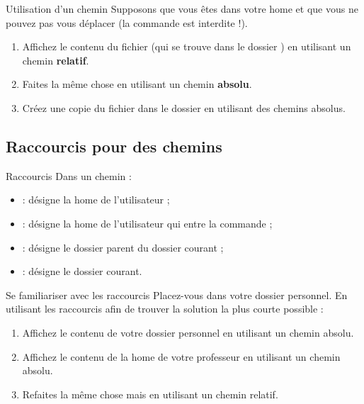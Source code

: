 \documentclass[a4paper,11pt]{style-esi/td}
\begin{document}
		\begin{Exercice}{Utilisation d'un chemin}
			Supposons que vous êtes dans votre home 
			et que vous ne pouvez pas vous déplacer 
			(la commande  est interdite !).
			\begin{enumerate}
			\item 
				Affichez le contenu du fichier 
				(qui se trouve dans le dossier )
				en utilisant un chemin \textbf{relatif}.
			\item 
				Faites la même chose 
				en utilisant un chemin \textbf{absolu}.
			\item
				Créez une copie du fichier  
				dans le dossier 
				en utilisant des chemins absolus.
			\end{enumerate}
		\end{Exercice}

	\subsection{Raccourcis pour des chemins}

		\begin{theorie}{Raccourcis}
			Dans un chemin :
			\begin{itemize}
			\item {} : désigne la home de l'utilisateur  ;
			\item \samp{\textasciitilde{}} : désigne la home de l'utilisateur qui entre la commande ;
			\item {} : désigne le dossier parent du dossier courant ;
			\item {} : désigne le dossier courant.
			\end{itemize}
		\end{theorie}

		\begin{Exercice}{Se familiariser avec les raccourcis}
			Placez-vous dans votre dossier personnel.
			En utilisant les raccourcis 
			afin de trouver la solution la plus courte possible :
			\begin{enumerate}
			\item Affichez le contenu de votre dossier personnel
				en utilisant un chemin absolu.
			\item Affichez le contenu de la home de votre professeur
				en utilisant un chemin absolu.
			\item Refaites la même chose mais en utilisant un chemin relatif.
			\end{enumerate}
		\end{Exercice}
\end{document}
